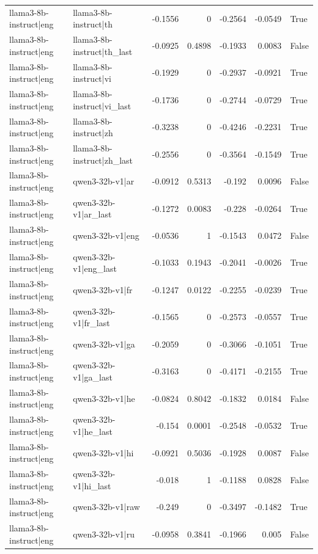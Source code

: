 \begin{table}
\begin{tabular}{l l r r r r l}
llama3-8b-instruct|eng & llama3-8b-instruct|th & -0.1556 & 0 & -0.2564 & -0.0549 & True \\
llama3-8b-instruct|eng & llama3-8b-instruct|th_last & -0.0925 & 0.4898 & -0.1933 & 0.0083 & False \\
llama3-8b-instruct|eng & llama3-8b-instruct|vi & -0.1929 & 0 & -0.2937 & -0.0921 & True \\
llama3-8b-instruct|eng & llama3-8b-instruct|vi_last & -0.1736 & 0 & -0.2744 & -0.0729 & True \\
llama3-8b-instruct|eng & llama3-8b-instruct|zh & -0.3238 & 0 & -0.4246 & -0.2231 & True \\
llama3-8b-instruct|eng & llama3-8b-instruct|zh_last & -0.2556 & 0 & -0.3564 & -0.1549 & True \\
llama3-8b-instruct|eng & qwen3-32b-v1|ar & -0.0912 & 0.5313 & -0.192 & 0.0096 & False \\
llama3-8b-instruct|eng & qwen3-32b-v1|ar_last & -0.1272 & 0.0083 & -0.228 & -0.0264 & True \\
llama3-8b-instruct|eng & qwen3-32b-v1|eng & -0.0536 & 1 & -0.1543 & 0.0472 & False \\
llama3-8b-instruct|eng & qwen3-32b-v1|eng_last & -0.1033 & 0.1943 & -0.2041 & -0.0026 & True \\
llama3-8b-instruct|eng & qwen3-32b-v1|fr & -0.1247 & 0.0122 & -0.2255 & -0.0239 & True \\
llama3-8b-instruct|eng & qwen3-32b-v1|fr_last & -0.1565 & 0 & -0.2573 & -0.0557 & True \\
llama3-8b-instruct|eng & qwen3-32b-v1|ga & -0.2059 & 0 & -0.3066 & -0.1051 & True \\
llama3-8b-instruct|eng & qwen3-32b-v1|ga_last & -0.3163 & 0 & -0.4171 & -0.2155 & True \\
llama3-8b-instruct|eng & qwen3-32b-v1|he & -0.0824 & 0.8042 & -0.1832 & 0.0184 & False \\
llama3-8b-instruct|eng & qwen3-32b-v1|he_last & -0.154 & 0.0001 & -0.2548 & -0.0532 & True \\
llama3-8b-instruct|eng & qwen3-32b-v1|hi & -0.0921 & 0.5036 & -0.1928 & 0.0087 & False \\
llama3-8b-instruct|eng & qwen3-32b-v1|hi_last & -0.018 & 1 & -0.1188 & 0.0828 & False \\
llama3-8b-instruct|eng & qwen3-32b-v1|raw & -0.249 & 0 & -0.3497 & -0.1482 & True \\
llama3-8b-instruct|eng & qwen3-32b-v1|ru & -0.0958 & 0.3841 & -0.1966 & 0.005 & False \\

\end{tabular}
\end{table}
